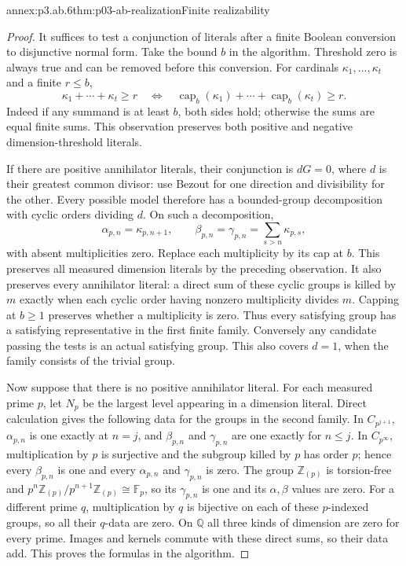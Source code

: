 \begin{annexitem}{annex:p3.ab.6}{thm:p03-ab-realization}{Finite realizability}
\begin{proof}
It suffices to test a conjunction of literals after a finite Boolean
conversion to disjunctive normal form. Take the bound \(b\) in the
algorithm. Threshold zero is always true and can be removed before
this conversion. For cardinals \(\kappa_1,\ldots,\kappa_t\) and a
finite \(r\leq b\),
\[
 \kappa_1+\cdots+\kappa_t\geq r
 \quad\Longleftrightarrow\quad
 \operatorname{cap}_b(\kappa_1)+\cdots+
 \operatorname{cap}_b(\kappa_t)\geq r.
\]
Indeed if any summand is at least \(b\), both sides hold; otherwise the
sums are equal finite sums. This observation preserves both positive
and negative dimension-threshold literals.

If there are positive annihilator literals, their conjunction is
\(dG=0\), where \(d\) is their greatest common divisor: use Bezout
for one direction and divisibility for the other. Every possible model
therefore has a bounded-group decomposition with cyclic orders dividing
\(d\). On such a decomposition,
\[
 \alpha_{p,n}=\kappa_{p,n+1},\qquad
 \beta_{p,n}=\gamma_{p,n}=\sum_{s>n}\kappa_{p,s},
\]
with absent multiplicities zero. Replace each multiplicity by its cap
at \(b\). This preserves all measured dimension literals by the preceding
observation. It also preserves every annihilator literal: a direct sum
of these cyclic groups is killed by \(m\) exactly when each cyclic
order having nonzero multiplicity divides \(m\). Capping at \(b\geq1\)
preserves whether a multiplicity is zero. Thus every satisfying group
has a satisfying representative in the first finite family. Conversely
any candidate passing the tests is an actual satisfying group. This
also covers \(d=1\), when the family consists of the trivial group.

Now suppose that there is no positive annihilator literal. For each
measured prime \(p\), let \(N_p\) be the largest level appearing in a
dimension literal. Direct calculation gives the following data for
the groups in the second family. In \(C_{p^{j+1}}\), \(\alpha_{p,n}\)
is one exactly at \(n=j\), and \(\beta_{p,n}\) and \(\gamma_{p,n}\)
are one exactly for \(n\leq j\). In \(C_{p^\infty}\), multiplication
by \(p\) is surjective and the subgroup killed by \(p\) has order
\(p\); hence every \(\beta_{p,n}\) is one and every \(\alpha_{p,n}\)
and \(\gamma_{p,n}\) is zero. The group \(\mathbb Z_{(p)}\) is
torsion-free and
\(p^n\mathbb Z_{(p)}/p^{n+1}\mathbb Z_{(p)}\cong\mathbb F_p\),
so its \(\gamma_{p,n}\) is one and its \(\alpha,\beta\) values are
zero. For a different prime \(q\), multiplication by \(q\) is
bijective on each of these \(p\)-indexed groups, so all their
\(q\)-data are zero. On \(\mathbb Q\) all three kinds of dimension
are zero for every prime. Images and kernels commute with these direct
sums, so their data add. This proves the formulas in the algorithm.


\end{proof}
\end{annexitem}
